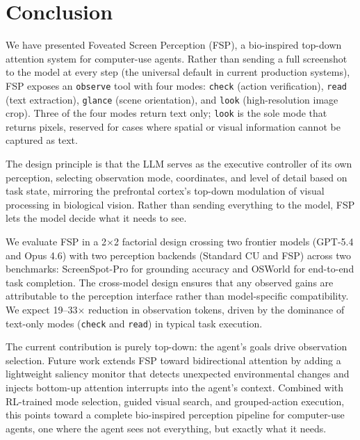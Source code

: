 \documentclass[11pt,a4paper]{article}
\begin{document}

\section{Conclusion}
\label{sec:conclusion}

We have presented Foveated Screen Perception (FSP), a bio-inspired top-down attention system for computer-use agents. Rather than sending a full screenshot to the model at every step (the universal default in current production systems), FSP exposes an \texttt{observe} tool with four modes: \texttt{check} (action verification), \texttt{read} (text extraction), \texttt{glance} (scene orientation), and \texttt{look} (high-resolution image crop). Three of the four modes return text only; \texttt{look} is the sole mode that returns pixels, reserved for cases where spatial or visual information cannot be captured as text.

The design principle is that the LLM serves as the executive controller of its own perception, selecting observation mode, coordinates, and level of detail based on task state, mirroring the prefrontal cortex's top-down modulation of visual processing in biological vision. Rather than sending everything to the model, FSP lets the model decide what it needs to see.

We evaluate FSP in a 2$\times$2 factorial design crossing two frontier models (GPT-5.4 and Opus 4.6) with two perception backends (Standard CU and FSP) across two benchmarks: ScreenSpot-Pro for grounding accuracy and OSWorld for end-to-end task completion. The cross-model design ensures that any observed gains are attributable to the perception interface rather than model-specific compatibility. We expect 19--33$\times$ reduction in observation tokens, driven by the dominance of text-only modes (\texttt{check} and \texttt{read}) in typical task execution.

The current contribution is purely top-down: the agent's goals drive observation selection. Future work extends FSP toward bidirectional attention by adding a lightweight saliency monitor that detects unexpected environmental changes and injects bottom-up attention interrupts into the agent's context. Combined with RL-trained mode selection, guided visual search, and grouped-action execution, this points toward a complete bio-inspired perception pipeline for computer-use agents, one where the agent sees not everything, but exactly what it needs.





\end{document}
